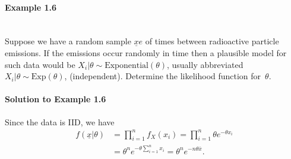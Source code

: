 \paragraph{Example 1.6}{~\\
Suppose we have a random sample $\underline{x}e$ of times between radioactive particle emissions. If the emissions occur randomly in time then a plausible model for such data would be $X_i|\theta\sim \text{Exponential}(\theta)$, usually abbreviated $X_{i}|\theta \sim \text{Exp}(\theta)$, (independent). Determine the likelihood function for~$\theta$.

\paragraph{Solution to Example 1.6}{
    
        Since the data is IID, we have
        \begin{align*}
            f(\underline{x}|\theta) &= \prod_{i=1}^n f_{X}(x_i) = \prod_{i=1}^n \theta e^{-\theta x_i} \\
            &= \theta^n e^{-\theta \sum_{i=1}^n x_i} = \theta^n e^{- n \theta \bar{x}}.
        \end{align*}
    
}}

\clearpage

